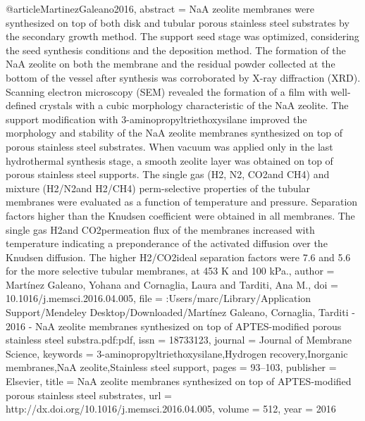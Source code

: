 @article{MartinezGaleano2016,
abstract = {NaA zeolite membranes were synthesized on top of both disk and tubular porous stainless steel substrates by the secondary growth method. The support seed stage was optimized, considering the seed synthesis conditions and the deposition method. The formation of the NaA zeolite on both the membrane and the residual powder collected at the bottom of the vessel after synthesis was corroborated by X-ray diffraction (XRD). Scanning electron microscopy (SEM) revealed the formation of a film with well-defined crystals with a cubic morphology characteristic of the NaA zeolite. The support modification with 3-aminopropyltriethoxysilane improved the morphology and stability of the NaA zeolite membranes synthesized on top of porous stainless steel substrates. When vacuum was applied only in the last hydrothermal synthesis stage, a smooth zeolite layer was obtained on top of porous stainless steel supports. The single gas (H2, N2, CO2and CH4) and mixture (H2/N2and H2/CH4) perm-selective properties of the tubular membranes were evaluated as a function of temperature and pressure. Separation factors higher than the Knudsen coefficient were obtained in all membranes. The single gas H2and CO2permeation flux of the membranes increased with temperature indicating a preponderance of the activated diffusion over the Knudsen diffusion. The higher H2/CO2ideal separation factors were 7.6 and 5.6 for the more selective tubular membranes, at 453 K and 100 kPa.},
author = {{Mart{\'{i}}nez Galeano}, Yohana and Cornaglia, Laura and Tarditi, Ana M.},
doi = {10.1016/j.memsci.2016.04.005},
file = {:Users/marc/Library/Application Support/Mendeley Desktop/Downloaded/Mart{\'{i}}nez Galeano, Cornaglia, Tarditi - 2016 - NaA zeolite membranes synthesized on top of APTES-modified porous stainless steel substra.pdf:pdf},
issn = {18733123},
journal = {Journal of Membrane Science},
keywords = {3-aminopropyltriethoxysilane,Hydrogen recovery,Inorganic membranes,NaA zeolite,Stainless steel support},
pages = {93--103},
publisher = {Elsevier},
title = {{NaA zeolite membranes synthesized on top of APTES-modified porous stainless steel substrates}},
url = {http://dx.doi.org/10.1016/j.memsci.2016.04.005},
volume = {512},
year = {2016}
}
